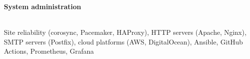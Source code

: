 \documentclass[margin]{res}
\newcommand{\Plus}{\raisebox{.4\height}{\scalebox{.6}{+}}}
\begin{document}
\begin{resume}
\textbf{System administration}\\
\vspace{-2.5em}\\
\begin{adjustwidth}{5mm}{}
Site reliability (corosync, Pacemaker, HAProxy), HTTP servers (Apache, Nginx), SMTP servers (Postfix), cloud platforms (AWS, DigitalOcean), Ansible, GitHub Actions, Prometheus, Grafana\\
\end{adjustwidth} \\

\end{resume}
\end{document}

